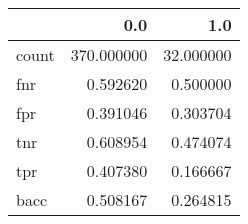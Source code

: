 \begin{tabular}{lrr}
\toprule
{} &         0.0 &        1.0 \\
\midrule
count &  370.000000 &  32.000000 \\
fnr   &    0.592620 &   0.500000 \\
fpr   &    0.391046 &   0.303704 \\
tnr   &    0.608954 &   0.474074 \\
tpr   &    0.407380 &   0.166667 \\
bacc  &    0.508167 &   0.264815 \\
\bottomrule
\end{tabular}
